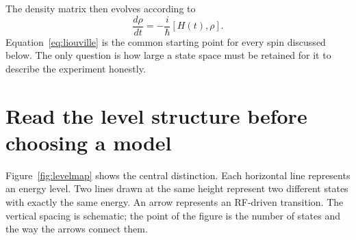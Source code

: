 \documentclass[11pt,letterpaper]{article}
\begin{document}
The density matrix then evolves according to
\begin{equation}
\frac{d\rho}{dt}=-\frac{i}{\hbar}[H(t),\rho].
\label{eq:liouville}
\end{equation}
Equation~\eqref{eq:liouville} is the common starting point for every spin discussed below. The only question is how large a state space must be retained for it to describe the experiment honestly.

\section{Read the level structure before choosing a model}

Figure~\ref{fig:levelmap} shows the central distinction. Each horizontal line represents an energy level. Two lines drawn at the same height represent two different states with exactly the same energy. An arrow represents an RF-driven transition. The vertical spacing is schematic; the point of the figure is the number of states and the way the arrows connect them.
\end{document}
